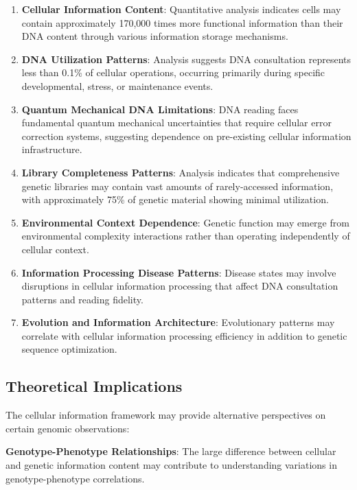 \documentclass[12pt,a4paper]{article}
\begin{document}
\begin{enumerate}
\item \textbf{Cellular Information Content}: Quantitative analysis indicates cells may contain approximately 170,000 times more functional information than their DNA content through various information storage mechanisms.

\item \textbf{DNA Utilization Patterns}: Analysis suggests DNA consultation represents less than 0.1\% of cellular operations, occurring primarily during specific developmental, stress, or maintenance events.

\item \textbf{Quantum Mechanical DNA Limitations}: DNA reading faces fundamental quantum mechanical uncertainties that require cellular error correction systems, suggesting dependence on pre-existing cellular information infrastructure.

\item \textbf{Library Completeness Patterns}: Analysis indicates that comprehensive genetic libraries may contain vast amounts of rarely-accessed information, with approximately 75\% of genetic material showing minimal utilization.

\item \textbf{Environmental Context Dependence}: Genetic function may emerge from environmental complexity interactions rather than operating independently of cellular context.

\item \textbf{Information Processing Disease Patterns}: Disease states may involve disruptions in cellular information processing that affect DNA consultation patterns and reading fidelity.

\item \textbf{Evolution and Information Architecture}: Evolutionary patterns may correlate with cellular information processing efficiency in addition to genetic sequence optimization.
\end{enumerate}

\subsection{Theoretical Implications}

The cellular information framework may provide alternative perspectives on certain genomic observations:

\textbf{Genotype-Phenotype Relationships}: The large difference between cellular and genetic information content may contribute to understanding variations in genotype-phenotype correlations.
\end{document}
